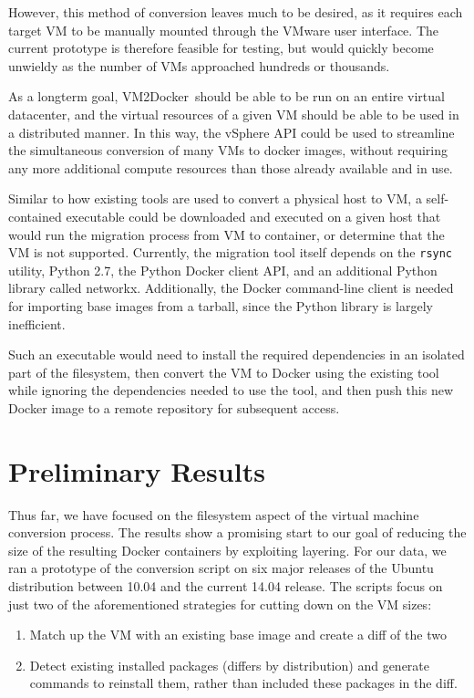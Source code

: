 \documentclass[\myfontsize, letterpaper]{article}
\newcommand{\projectname}{VM2Docker}
\begin{document}
However, this method of conversion leaves much to be desired, as it requires each target VM to be manually mounted through the VMware user interface. The current prototype is therefore feasible for testing, but would quickly become unwieldy as the number of VMs approached hundreds or thousands.

As a longterm goal, \projectname\ should be able to be run on an entire virtual datacenter, and the virtual resources of a given VM should be able to be used in a distributed manner. In this way, the vSphere API could be used to streamline the simultaneous conversion of many VMs to docker images, without requiring any more additional compute resources than those already available and in use.

Similar to how existing tools are used to convert a physical host to VM, a self-contained executable could be downloaded and executed on a given host that would run the migration process from VM to container, or determine that the VM is not supported. Currently, the migration tool itself depends on the \texttt{rsync} utility, Python 2.7, the Python Docker client API, and an additional Python library called networkx. Additionally, the Docker command-line client is needed for importing base images from a tarball, since the Python library is largely inefficient.

Such an executable would need to install the required dependencies in an isolated part of the filesystem, then convert the VM to Docker using the existing tool while ignoring the dependencies needed to use the tool, and then push this new Docker image to a remote repository for subsequent access.

\section{Preliminary Results}

Thus far, we have focused on the filesystem aspect of the virtual machine conversion process. The results show a promising start to our goal of reducing the size of the resulting Docker containers by exploiting layering. For our data, we ran a prototype of the conversion script on six major releases of the Ubuntu distribution between 10.04 and the current 14.04 release. The scripts focus on just two of the aforementioned strategies for cutting down on the VM sizes:

\begin{enumerate}
\item Match up the VM with an existing base image and create a diff of the two
\item Detect existing installed packages (differs by distribution) and generate commands to reinstall them, rather than included these packages in the diff.
\end{enumerate}
\end{document}
